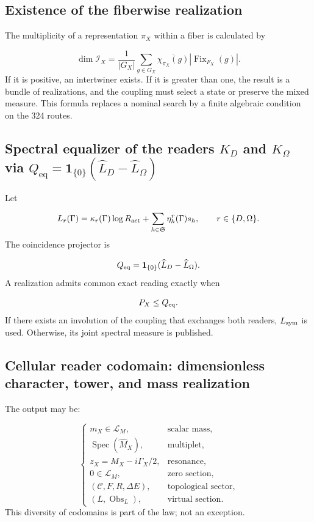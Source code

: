 \subsection{Existence of the fiberwise realization}
The multiplicity of a representation \(\pi_X\) within a fiber is calculated by

\[
 \dim\mathscr I_X=
 \frac1{|G_X|}
 \sum_{g\in G_X}
 \overline{\chi_{\pi_X}(g)}
 |\operatorname{Fix}_{F_X}(g)|.
\]
If it is positive, an intertwiner exists. If it is greater than one, the result is a bundle of realizations, and the coupling must select a state or preserve the mixed measure. This formula replaces a nominal search by a finite algebraic condition on the 324 routes.

\subsection{Spectral equalizer of the readers \(K_D\) and \(K_\Omega\) via \(Q_{\mathrm{eq}}=\mathbf1_{\{0\}}(\widehat L_D-\widehat L_\Omega)\)}
Let

\[
 L_r(\Gamma)=
 \kappa_r(\Gamma)\log R_{\rm act}
 +\sum_{h\in\mathfrak S}\eta_h^r(\Gamma)s_h,
 \qquad r\in\{D,\Omega\}.
\]
The coincidence projector is

\[
 Q_{\rm eq}=
 \mathbf1_{\{0\}}(\widehat L_D-\widehat L_\Omega).
\]
A realization admits common exact reading exactly when

\[
 P_X\le Q_{\rm eq}.
\]
If there exists an involution of the coupling that exchanges both readers, \(L_{\rm sym}\) is used. Otherwise, its joint spectral measure is published.

\subsection{Cellular reader codomain: dimensionless character, tower, and mass realization}
The output may be:

\[
 \begin{cases}
 m_X\in\mathcal L_M,&\text{scalar mass},\\
 \operatorname{Spec}(\widehat M_X),&\text{multiplet},\\
 z_X=M_X-i\Gamma_X/2,&\text{resonance},\\
 0\in\mathcal L_M,&\text{zero section},\\
 (\mathcal C,F,R,\Delta E),&\text{topological sector},\\
 (L,\operatorname{Obs}_L),&\text{virtual section}.
 \end{cases}
\]
This diversity of codomains is part of the law; not an exception.

